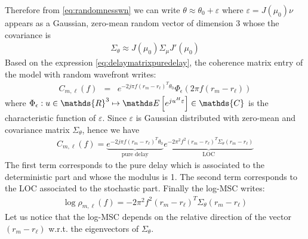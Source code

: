 Therefore from \eqref{eq:randomnesswn} we can write $\theta\approx \theta_{0}+\varepsilon$ where $\varepsilon=J(\mu_{0})\nu$ appears as a Gaussian, zero-mean random vector of dimension 3 whose the covariance is
\begin{eqnarray}
 \label{eq:aec2theta}
\Sigma_{\theta} \approx J(\mu_{0}) \Sigma_{\mu} J'(\mu_{0})
\end{eqnarray}
Based on the expression \eqref{eq:delaymatrixpuredelay}, the coherence matrix entry of the model with random wavefront writes:
\begin{eqnarray*}
   C_{m,\ell}(f)&=&e^{-2j\pi f(r_{m}-r_{\ell})^{T}\theta_{0}}
   \Phi_{\epsilon}(2\pi f(r_{m}-r_{\ell}))
\end{eqnarray*}
where $\Phi_{\epsilon}:u\in\mathds{R}^{3}\mapsto\esp{e^{ju^{H}\varepsilon}}\in\mathds{C}$ is the characteristic function of $\varepsilon$. 
Since $\varepsilon$ is Gaussian distributed with zero-mean and covariance matrix $\Sigma_{\theta}$, hence we have
\begin{eqnarray}
\label{eq:Cfr1r2Gaussian}
C_{m,\ell}(f)=
\underbrace{e^{-2j\pi f(r_{m}-r_{\ell})^{T}\theta_{0}}}_{\text{pure delay}}
 \underbrace{e^{-2\pi^{2}f^{2}(r_{m}-r_{\ell})^{T}\Sigma_{\theta}(r_{m}-r_{\ell})}}_{\text{LOC}}
 \end{eqnarray}
The first term corresponds to the pure delay which is associated to the deterministic part and whose the modulus is 1. The second term corresponds to the LOC associated to the stochastic part. Finally the log-MSC writes:
\begin{eqnarray}
 \label{eq:logcoherencemodel}
 \log\rho_{m,\ell}(f)=-2\pi^{2}f^{2}(r_{m}-r_{\ell})^{T}\Sigma_{\theta}(r_{m}-r_{\ell})
\end{eqnarray}
Let us notice that the log-MSC depends on the relative direction of the vector $(r_{m}-r_{\ell})$ w.r.t. the eigenvectors of $\Sigma_{\theta}$. 


